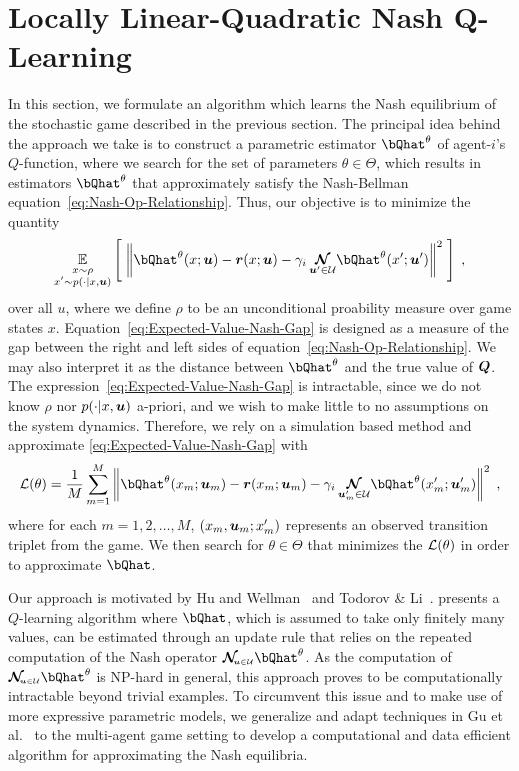 \documentclass[onefignum,onetabnum]{siamonline171218}
\begin{document}
\section{Locally Linear-Quadratic Nash Q-Learning}
\label{sec:Locally-Linear-Quadratic-Algortithm}

In this section, we formulate an algorithm which learns the Nash equilibrium of the stochastic game described in the previous section. The principal idea behind the approach we take is to construct a parametric estimator $\bQhat^\theta$ of  agent-$i$'s $Q$-function, where we search for the set of parameters $\theta\in\Theta$, which results in estimators $\bQhat^\theta$ that approximately satisfy the Nash-Bellman equation~\eqref{eq:Nash-Op-Relationship}. Thus, our objective is to minimize the quantity
\begin{equation} \label{eq:Expected-Value-Nash-Gap}
	\EE{\substack{ \vphantom{A}  x \sim \rho \\ x^\prime \sim p(\cdot \mid x,\bu)}}
	\left[ \; \left\|
		\bQhat^\theta ( x ; \bu )
		- \br(x;\bu) - \gamma_i \, \NashOp{\bu^\prime \in\U} \bQhat^\theta(x^\prime; \bu^\prime )
	\right\|^2 \; \right]
	\;,
\end{equation}
over all $u$, where we define $\rho$ to be an unconditional proability measure over game states $x$. Equation~\eqref{eq:Expected-Value-Nash-Gap} is designed as a measure of the gap between the right and left sides of equation~\eqref{eq:Nash-Op-Relationship}. We may also interpret it as the distance between $\bQhat^\theta$ and the true value of $\bm{Q}$. The expression~\eqref{eq:Expected-Value-Nash-Gap} is intractable, since we do not know $\rho$ nor $p(\cdot|x,{\bm{u}})$ a-priori, and we wish to make little to no assumptions on the system dynamics. Therefore, we rely on a simulation based method  and approximate  \eqref{eq:Expected-Value-Nash-Gap} with
\begin{equation} \label{eq:Empirical-Nash-Gap}
	\L(\theta) =\frac{1}{M}\sum_{m=1}^M
	\left\lVert
		\bQhat^\theta ( x_{m} ; \bu_{m} )
		- \br(x_{m};\bu_{m}) - \gamma_i \, \NashOp{\bu_{m}^\prime \in\U} \bQhat^\theta(x_{m}^\prime; \bu_{m}^\prime )
	\right\rVert^2
	\;,
\end{equation}
where for each $m=1,2,\dots,M$, $(x_m,{\bm{u}}_m;x^\prime_m)$ represents an observed transition triplet from the game. We then   search for $\theta\in\Theta$ that minimizes the $\mathcal{L}(\theta)$ in order to approximate $\bQhat$.

Our approach is motivated by Hu and Wellman~\cite{hu2003nash} and Todorov \& Li~\cite{todorov2005generalized}. \cite{hu2003nash} presents a $Q$-learning algorithm where $\bQhat$, which is assumed to take only finitely many values, can be estimated through an update rule that relies on the repeated computation of the Nash operator $\NashOp{\bu\in\U} \bQhat^\theta$. As the computation of $\NashOp{\bu\in\U} \bQhat^\theta$ is NP-hard in general, this approach proves to be computationally intractable beyond trivial examples. To circumvent this issue and to make use of more expressive parametric models, we generalize and adapt techniques in Gu et al.~\cite{gu2016continuous} to the multi-agent game setting to develop a computational and data efficient algorithm for approximating the Nash equilibria.
\end{document}
